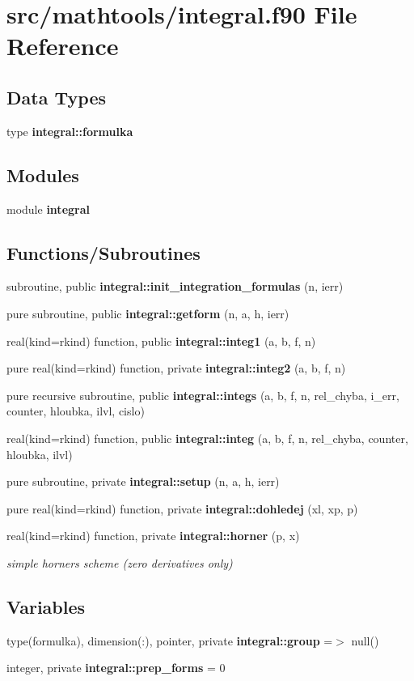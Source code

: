 \section{src/mathtools/integral.f90 File Reference}
\label{integral_8f90}
\subsection*{Data Types}
\begin{DoxyCompactItemize}
\item 
type {\bf integral\+::formulka}
\end{DoxyCompactItemize}
\subsection*{Modules}
\begin{DoxyCompactItemize}
\item 
module {\bf integral}
\end{DoxyCompactItemize}
\subsection*{Functions/\+Subroutines}
\begin{DoxyCompactItemize}
\item 
subroutine, public {\bf integral\+::init\+\_\+integration\+\_\+formulas} (n, ierr)
\item 
pure subroutine, public {\bf integral\+::getform} (n, a, h, ierr)
\item 
real(kind=rkind) function, public {\bf integral\+::integ1} (a, b, f, n)
\item 
pure real(kind=rkind) function, private {\bf integral\+::integ2} (a, b, f, n)
\item 
pure recursive subroutine, public {\bf integral\+::integs} (a, b, f, n, rel\+\_\+chyba, i\+\_\+err, counter, hloubka, ilvl, cislo)
\item 
real(kind=rkind) function, public {\bf integral\+::integ} (a, b, f, n, rel\+\_\+chyba, counter, hloubka, ilvl)
\item 
pure subroutine, private {\bf integral\+::setup} (n, a, h, ierr)
\item 
pure real(kind=rkind) function, private {\bf integral\+::dohledej} (xl, xp, p)
\item 
real(kind=rkind) function, private {\bf integral\+::horner} (p, x)
\begin{DoxyCompactList}\small\item\em simple horner\textquotesingle{}s scheme (zero derivatives only) \end{DoxyCompactList}\end{DoxyCompactItemize}
\subsection*{Variables}
\begin{DoxyCompactItemize}
\item 
type(formulka), dimension(\+:), pointer, private {\bf integral\+::group} =$>$ null()
\item 
integer, private {\bf integral\+::prep\+\_\+forms} = 0
\end{DoxyCompactItemize}
